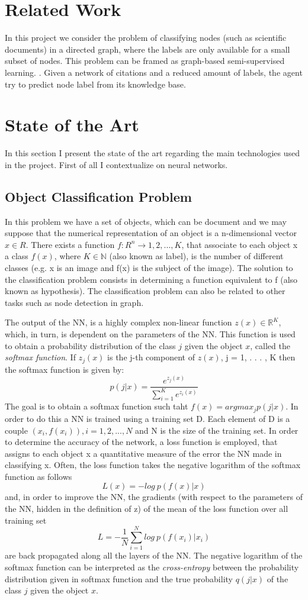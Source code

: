 \documentclass{report}
\begin{document}
\section{Related Work}
In this project we consider the problem of classifying nodes (such as scientific documents) in a directed graph,  where the labels are only available for a small subset of nodes. This problem can be framed as graph-based semi-supervised learning. \cite{Kipf_GCN}. Given a network of citations and a reduced amount of labels, the agent try to predict node label from its knowledge base.


\section{State of the Art}
In this section I present the state of the art regarding the main technologies used in the project.
First of all I contextualize on neural networks.
\subsection{Object Classification Problem}
In this problem we have a set of objects, which can be document and we may suppose that the numerical representation of an object is a n-dimensional vector $x \in R$. There exists a function $f : R^n \rightarrow {1, 2, . . . , K}$, that associate to each object x a class $f(x)$, where $K \in \mathbb{N}$ (also known as label), is the number of different classes (e.g. x is an image and f(x)
is the subject of the image). The solution to the classification problem consists in
determining a function equivalent to f (also known as hypothesis).
The classification problem can also be related to other tasks such as node detection in graph.

The output of the NN, is a highly complex non-linear function $z(x) \in \mathbb{R}^K$,
which, in turn, is dependent on the parameters of the NN. This function is used to obtain a probability distribution of the class $j$ given the object $x$, called the
\textit{softmax function}. If $z_j(x)$ is the j-th component of $z(x)$, j = 1, . . . , K then the softmax function is given by:
\[
p(j|x) = \dfrac{e^{z_j(x)}}{\sum_{i=1}^{K} e^{z_i(x)}}
\]
The goal is to obtain a softmax function such taht $f(x)=argmax_jp(j|x)$.
In order to do this a NN is trained using a training set D. Each element of D is a couple $(x_i,f(x_i)), i=1,2,...,N$ and N is the size of the training set. In order to determine the accuracy of the network, a loss function is employed, that assigns to each object x a quantitative measure of the error the NN made in
classifying x. Often, the loss function takes the negative logarithm of the softmax function as follows
\[
L(x)=-log\ p(f(x)|x)
\]
and, in order to improve the NN, the gradients (with respect to the parameters of the NN, hidden in the definition of z) of the mean of the loss function over all training set
\[
L = -\dfrac{1}{N}\sum_{i=1}^{N} log\ p(f(x_i)|x_i) 
\]
are back propagated along all the layers of the NN. The negative logarithm of the softmax function can be interpreted as the \textit{cross-entropy} between the probability
distribution given in softmax function and the true probability $q(j|x)$ of the class $j$ given the object $x$.
\end{document}
